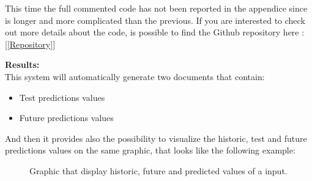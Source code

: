 This time the full commented code has not been reported in the appendice since is longer and more complicated than the previous. If you are interested to check out more details about the code, is possible to find the Github repository here : [\ref{Repository}]

\textbf{Results:}\\
This system will automatically generate two documents that contain:
\vspace{-5mm}
\begin{itemize}
 \setlength{\itemsep}{-5pt} 
\item Test predictions values
\item Future predictions values
\end{itemize}

And then it provides also the possibility to visualize the historic, test and future predictions values on the same graphic, that looks like the following example:

\begin{figure}[H]
    \caption{Graphic that display historic, future and predicted values of a input.}
\end{figure}


\newpage



